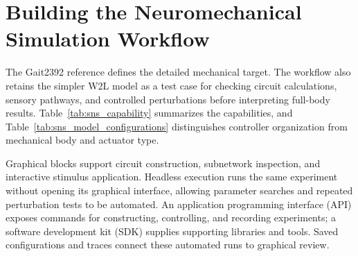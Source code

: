 \FloatBarrier

\section{Building the Neuromechanical Simulation Workflow}\label{sec:preliminary_sim_methods}\label{sec:preliminary_sim_results}

The Gait2392 reference defines the detailed mechanical target. The workflow also retains the simpler W2L model as a test case for checking circuit calculations, sensory pathways, and controlled perturbations before interpreting full-body results. Table~\ref{tab:sns_capability} summarizes the capabilities, and Table~\ref{tab:sns_model_configurations} distinguishes controller organization from mechanical body and actuator type.

Graphical blocks support circuit construction, subnetwork inspection, and interactive stimulus application. Headless execution runs the same experiment without opening its graphical interface, allowing parameter searches and repeated perturbation tests to be automated. An application programming interface (API) exposes commands for constructing, controlling, and recording experiments; a software development kit (SDK) supplies supporting libraries and tools. Saved configurations and traces connect these automated runs to graphical review.

